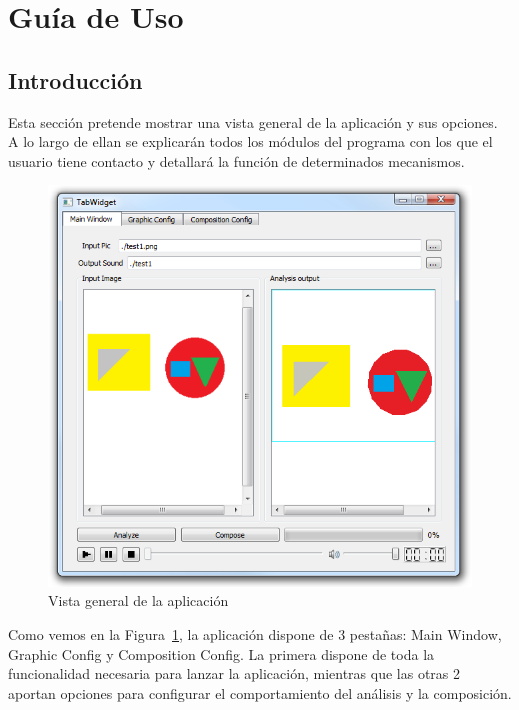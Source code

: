 \section{Guía de Uso}

	\subsection{Introducción}
		
		Esta sección pretende mostrar una vista general de la aplicación y sus opciones. A lo largo de ellan se explicarán todos los módulos del programa con los que el usuario tiene contacto y detallará la función de determinados mecanismos.\\
		
		\begin{figure}[htbp]
		\centering
		\includegraphics[scale=0.57]{graphics/interfazoverview.png}
		\caption{Vista general de la aplicación}
		\label{fig:interfazoverview}
		\end{figure}
		
		Como vemos en la Figura~\ref{fig:interfazoverview}, la aplicación dispone de 3 pestañas: Main Window, Graphic Config y Composition Config. La primera dispone de toda la funcionalidad necesaria para lanzar la aplicación, mientras que las otras 2 aportan opciones para configurar el comportamiento del análisis y la composición.\\
		
